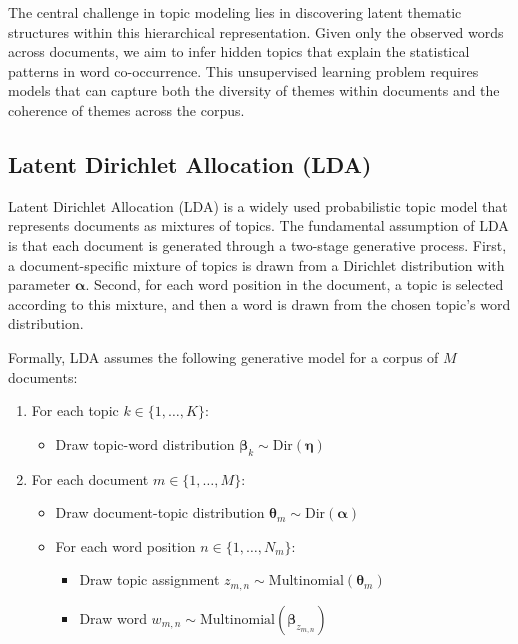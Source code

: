 \documentclass[12pt]{article}
\begin{document}
The central challenge in topic modeling lies in discovering latent thematic
structures within this hierarchical representation. Given only the observed
words across documents, we aim to infer hidden topics that explain the
statistical patterns in word co-occurrence. This unsupervised learning problem
requires models that can capture both the diversity of themes within documents
and the coherence of themes across the corpus.

\subsection{Latent Dirichlet Allocation (LDA)}
Latent Dirichlet Allocation (LDA) \cite{blei2003latent} is a widely used
probabilistic topic model that represents documents as mixtures of topics. The
fundamental assumption of LDA is that each document is generated through a
two-stage generative process. First, a document-specific mixture of topics is
drawn from a Dirichlet distribution with parameter $\boldsymbol{\alpha}$.
Second, for each word position in the document, a topic is selected according
to this mixture, and then a word is drawn from the chosen topic's word
distribution.

Formally, LDA assumes the following generative model for a corpus of $M$
documents:

\begin{enumerate}
    \item For each topic $k \in \{1, \ldots, K\}$:
          \begin{itemize}
              \item Draw topic-word distribution $\boldsymbol{\beta}_k \sim
                        \text{Dir}(\boldsymbol{\eta})$
          \end{itemize}
    \item For each document $m \in \{1, \ldots, M\}$:
          \begin{itemize}
              \item Draw document-topic distribution $\boldsymbol{\theta}_m \sim
                        \text{Dir}(\boldsymbol{\alpha})$
              \item For each word position $n \in \{1, \ldots, N_m\}$:
                    \begin{itemize}
                        \item Draw topic assignment $z_{m,n} \sim \text{Multinomial}(\boldsymbol{\theta}_m)$
                        \item Draw word $w_{m,n} \sim \text{Multinomial}(\boldsymbol{\beta}_{z_{m,n}})$
                    \end{itemize}
          \end{itemize}
\end{enumerate}
\end{document}
